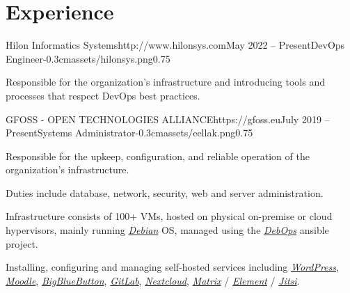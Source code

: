 \documentclass{mycv}
\begin{document}
	\section{Experience}

	\begin{EntryDatedLogo}{Hilon Informatics Systems}{http://www.hilonsys.com}{May 2022 -- Present}{DevOps Engineer}{-0.3cm}{assets/hilonsys.png}{0.75}
		\vspace{-0.2cm}
		\begin{Itemize}
			\item Responsible for the organization's infrastructure and introducing tools and processes that respect DevOps best practices.
		\end{Itemize}
	\end{EntryDatedLogo}

	\vspace{0.75cm}

	\begin{EntryDatedLogo}{GFOSS - OPEN TECHNOLOGIES ALLIANCE}{https://gfoss.eu}{July 2019 -- Present}{Systems Administrator}{-0.3cm}{assets/eellak.png}{0.75}
		\vspace{-0.2cm}
		\begin{Itemize}
			\item Responsible for the upkeep, configuration, and reliable operation of the organization's infrastructure.
			\item Duties include database, network, security, web and server administration.
			\item Infrastructure consists of 100+ VMs, hosted on physical on-premise or cloud hypervisors, mainly running \href{https://www.debian.org}{\textit{Debian}} OS, managed using the \href{https://debops.org}{\textit{DebOps}} ansible project.
			\item Installing, configuring and managing self-hosted services including \href{https://wordpress.com}{\textit{WordPress}}, \href{https://moodle.org}{\textit{Moodle}}, \href{https://bigbluebutton.org}{\textit{BigBlueButton}}, \href{https://about.gitlab.com/install/}{\textit{GitLab}}, \href{https://nextcloud.com}{\textit{Nextcloud}}, \href{https://matrix.org}{\textit{Matrix}} / \href{https://element.io}{\textit{Element}} / \href{https://jitsi.org}{\textit{Jitsi}}.
		\end{Itemize}
	\end{EntryDatedLogo}
\end{document}
